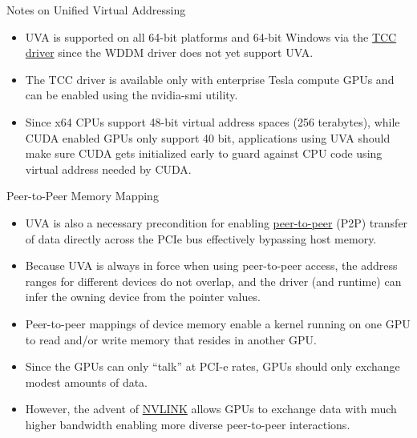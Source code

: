 \documentclass{beamer}
\begin{document}
\begin{frame}{Notes on Unified Virtual Addressing}
\begin{itemize}
\itemsep1em
    \item<1->UVA is supported on all 64-bit platforms and 64-bit Windows via the \href{http://http.developer.nvidia.com/ParallelNsight/2.1/Documentation/UserGuide/HTML/Content/Tesla_Compute_Cluster.htm}{\color{blue}TCC driver} since the WDDM driver does not yet support UVA.
    \item<1->The TCC driver is available only with enterprise Tesla compute GPUs and can be enabled using the {\selectfont nvidia-smi} utility.
    \item<1->Since x64 CPUs support 48-bit virtual address spaces (256 terabytes), while CUDA enabled GPUs only support 40 bit, applications using UVA should make sure CUDA gets initialized early to guard against CPU code using virtual address needed by CUDA.
\end{itemize}
\end{frame}

\begin{frame}{Peer-to-Peer Memory Mapping}
\begin{itemize}
    \item<1->UVA is also a necessary precondition for enabling \href{http://docs.nvidia.com/cuda/cuda-c-programming-guide/index.html\#peer-to-peer-memory-access}{\color{blue}peer-to-peer} (P2P) transfer of data directly across the PCIe bus effectively bypassing host memory.
    \item<1->Because UVA is always in force when using peer-to-peer access, the address ranges for different devices do not overlap, and the driver (and runtime) can infer the owning device from the pointer values.
    \item<1->Peer-to-peer mappings of device memory enable a kernel running on one GPU to read and/or write memory that resides in another GPU.
    \item<1-> Since the GPUs can only ``talk'' at PCI-e rates, GPUs should only exchange modest amounts of data.
    \item<1->However, the advent of \href{http://www.nvidia.com/object/nvlink.html}{\color{blue}NVLINK} allows GPUs to exchange data with much higher bandwidth enabling more diverse peer-to-peer interactions.
\end{itemize}
\end{frame}
\end{document}
